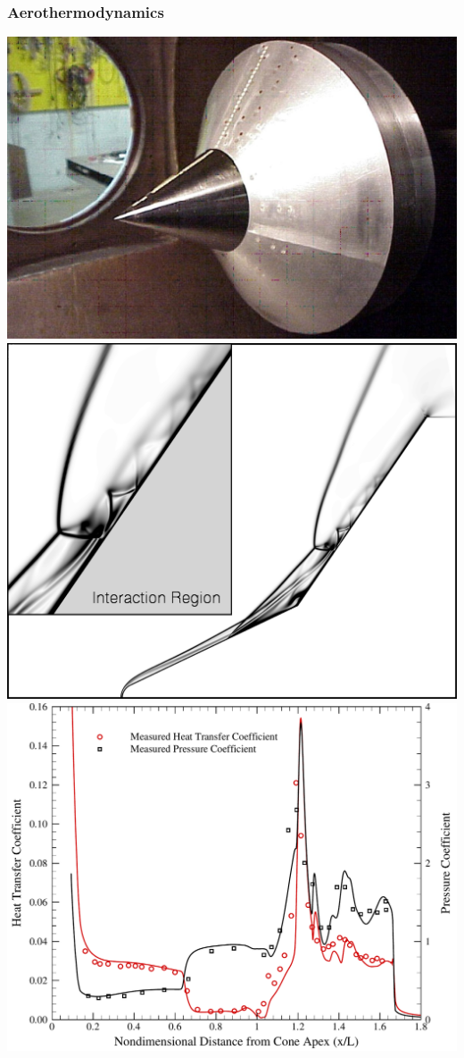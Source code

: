 \documentclass[compress,11pt]{beamer}
\begin{document}
\frame
{
  \frametitle{\scriptsize Aerothermodynamics}
  \vspace{-2em}
  \begin{center}
    \includegraphics[height=.35\textheight]{figures/holden_double_cone/test_article}
    \includegraphics[height=.35\textheight]{figures/holden_double_cone/schlieren}
    \includegraphics[height=.35\textheight]{figures/holden_double_cone/ch_cp_comparison}
  \end{center}
  
}
\end{document}
